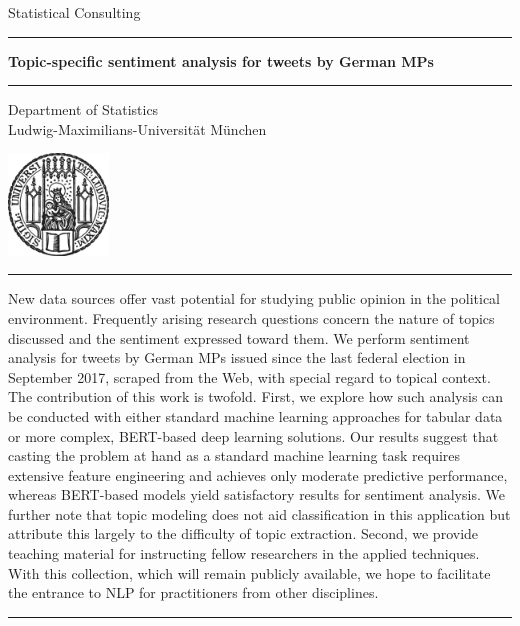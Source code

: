 \documentclass[12pt]{article}
\begin{document}


 
\begin{titlepage}
\begin{center}
    
\large
Statistical Consulting
    
\vspace{0.5cm}
      
\rule{\textwidth}{1pt}
\textbf{Topic-specific sentiment analysis for tweets by German MPs}
\rule{\textwidth}{1pt}
   
\vspace{0.5cm}
      
\normalsize
Department of Statistics \\
Ludwig-Maximilians-Universität München 

\vspace{0.5cm}

\includegraphics[width = 0.2\textwidth]{figures/sigillum.png}

\vspace{0.5cm}

\rule{\textwidth}{1pt}
\small
New data sources offer vast potential for studying public opinion in the 
political environment.
Frequently arising research questions concern the nature of topics discussed 
and the sentiment expressed toward them.
We perform sentiment analysis for tweets by German MPs issued since the last 
federal election in September 2017, scraped from the Web, with special regard to 
topical context.
The contribution of this work is twofold.
First, we explore how such analysis can be conducted with either standard 
machine learning approaches for tabular data or more complex, BERT-based deep 
learning solutions.
Our results suggest that casting the problem at hand as a standard machine 
learning task requires extensive feature engineering and achieves only moderate
predictive performance, whereas BERT-based models yield satisfactory 
results for sentiment analysis.
We further note that topic modeling does not aid classification in this 
application but attribute this largely to the difficulty of topic extraction.
Second, we provide teaching material for instructing fellow researchers in the 
applied techniques.
With this collection, which will remain publicly available, we hope to 
facilitate the entrance to NLP for practitioners from other disciplines.
\rule{\textwidth}{1pt}


\end{center}
\end{titlepage}
\end{document}

